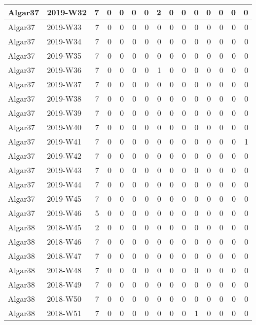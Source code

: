 \documentclass[]{book}
\begin{document}
\begin{table}
\begin{tabular}[t]{l|l|r|r|r|r|r|r|r|r|r|r|r|r|r}
\hline
Algar37 & 2019-W32 & 7 & 0 & 0 & 0 & 0 & 2 & 0 & 0 & 0 & 0 & 0 & 0 & 0\\
\hline
Algar37 & 2019-W33 & 7 & 0 & 0 & 0 & 0 & 0 & 0 & 0 & 0 & 0 & 0 & 0 & 0\\
\hline
Algar37 & 2019-W34 & 7 & 0 & 0 & 0 & 0 & 0 & 0 & 0 & 0 & 0 & 0 & 0 & 0\\
\hline
Algar37 & 2019-W35 & 7 & 0 & 0 & 0 & 0 & 0 & 0 & 0 & 0 & 0 & 0 & 0 & 0\\
\hline
Algar37 & 2019-W36 & 7 & 0 & 0 & 0 & 0 & 1 & 0 & 0 & 0 & 0 & 0 & 0 & 0\\
\hline
Algar37 & 2019-W37 & 7 & 0 & 0 & 0 & 0 & 0 & 0 & 0 & 0 & 0 & 0 & 0 & 0\\
\hline
Algar37 & 2019-W38 & 7 & 0 & 0 & 0 & 0 & 0 & 0 & 0 & 0 & 0 & 0 & 0 & 0\\
\hline
Algar37 & 2019-W39 & 7 & 0 & 0 & 0 & 0 & 0 & 0 & 0 & 0 & 0 & 0 & 0 & 0\\
\hline
Algar37 & 2019-W40 & 7 & 0 & 0 & 0 & 0 & 0 & 0 & 0 & 0 & 0 & 0 & 0 & 0\\
\hline
Algar37 & 2019-W41 & 7 & 0 & 0 & 0 & 0 & 0 & 0 & 0 & 0 & 0 & 0 & 0 & 1\\
\hline
Algar37 & 2019-W42 & 7 & 0 & 0 & 0 & 0 & 0 & 0 & 0 & 0 & 0 & 0 & 0 & 0\\
\hline
Algar37 & 2019-W43 & 7 & 0 & 0 & 0 & 0 & 0 & 0 & 0 & 0 & 0 & 0 & 0 & 0\\
\hline
Algar37 & 2019-W44 & 7 & 0 & 0 & 0 & 0 & 0 & 0 & 0 & 0 & 0 & 0 & 0 & 0\\
\hline
Algar37 & 2019-W45 & 7 & 0 & 0 & 0 & 0 & 0 & 0 & 0 & 0 & 0 & 0 & 0 & 0\\
\hline
Algar37 & 2019-W46 & 5 & 0 & 0 & 0 & 0 & 0 & 0 & 0 & 0 & 0 & 0 & 0 & 0\\
\hline
Algar38 & 2018-W45 & 2 & 0 & 0 & 0 & 0 & 0 & 0 & 0 & 0 & 0 & 0 & 0 & 0\\
\hline
Algar38 & 2018-W46 & 7 & 0 & 0 & 0 & 0 & 0 & 0 & 0 & 0 & 0 & 0 & 0 & 0\\
\hline
Algar38 & 2018-W47 & 7 & 0 & 0 & 0 & 0 & 0 & 0 & 0 & 0 & 0 & 0 & 0 & 0\\
\hline
Algar38 & 2018-W48 & 7 & 0 & 0 & 0 & 0 & 0 & 0 & 0 & 0 & 0 & 0 & 0 & 0\\
\hline
Algar38 & 2018-W49 & 7 & 0 & 0 & 0 & 0 & 0 & 0 & 0 & 0 & 0 & 0 & 0 & 0\\
\hline
Algar38 & 2018-W50 & 7 & 0 & 0 & 0 & 0 & 0 & 0 & 0 & 0 & 0 & 0 & 0 & 0\\
\hline
Algar38 & 2018-W51 & 7 & 0 & 0 & 0 & 0 & 0 & 0 & 0 & 1 & 0 & 0 & 0 & 0\\

\end{tabular}
\end{table}
\end{document}
